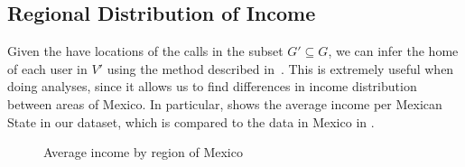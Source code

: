 \subsection{Regional Distribution of Income}

Given the have locations of the calls in the subset $G' \subseteq G$, we can infer the home of each user in $V'$ using the method described in~\cite{csaji2013}. This is extremely useful when doing analyses, since it allows us to find differences in income distribution between areas of Mexico. In particular,  shows the average income per Mexican State in our dataset, which is compared to the data in Mexico in .

\begin{figure}
\centering
{}
\caption{Average income by region of Mexico}
\label{fig:regions}
\end{figure}

